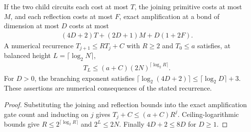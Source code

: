 \begin{lemma}
    \label{thm:mpu_explicit_amplified_recursion_bound}
    \leanok
    If the two child circuits each cost at most $T$, the joining
    primitive costs at most $M$, and each reflection costs at most $F$,
    exact amplification at a bond of dimension at most $D$ costs at most
    \begin{align}
        (4D+2)T+(2D+1)M+D(1+2F).
    \end{align}
    A numerical recurrence $T_{j+1}\leq RT_j+C$ with $R\geq2$
    and $T_0\leq a$ satisfies, at balanced height
    $L=\lceil\log_2N\rceil$,
    \begin{align}
        T_L\leq(a+C)(2N)^{\lceil\log_2R\rceil}.
    \end{align}
    For $D>0$, the branching exponent satisfies
    $\lceil\log_2(4D+2)\rceil\leq\lceil\log_2D\rceil+3$.
    These assertions are numerical consequences of the stated recurrence.
\end{lemma}
\begin{proof}\leanok
    Substituting the joining and reflection bounds into the exact
    amplification gate count and inducting on $j$ gives
    $T_j+C\leq(a+C)R^j$. Ceiling-logarithmic bounds give
    $R\leq2^{\lceil\log_2R\rceil}$ and $2^L\leq2N$.
    Finally $4D+2\leq8D$ for $D\geq1$.
\end{proof}

